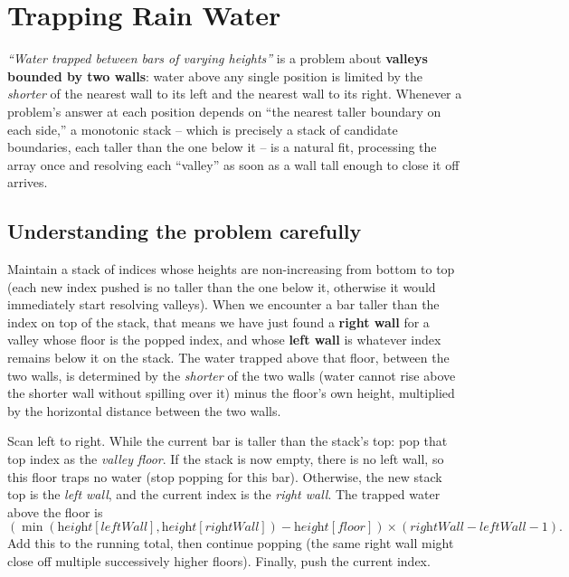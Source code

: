 \section{Trapping Rain Water}
\label{sec:sq-trapping-rain-water}


\begin{patternbox}
\emph{``Water trapped between bars of varying heights''} is a problem
about \textbf{valleys bounded by two walls}: water above any single
position is limited by the \emph{shorter} of the nearest wall to its left
and the nearest wall to its right. Whenever a problem's answer at each
position depends on ``the nearest taller boundary on each side,'' a
monotonic stack -- which is precisely a stack of candidate boundaries,
each taller than the one below it -- is a natural fit, processing the
array once and resolving each ``valley'' as soon as a wall tall enough to
close it off arrives.
\end{patternbox}

\subsection*{Understanding the problem carefully}

Maintain a stack of indices whose heights are non-increasing from bottom
to top (each new index pushed is no taller than the one below it,
otherwise it would immediately start resolving valleys). When we
encounter a bar taller than the index on top of the stack, that means we
have just found a \textbf{right wall} for a valley whose floor is the
popped index, and whose \textbf{left wall} is whatever index remains below
it on the stack. The water trapped above that floor, between the two
walls, is determined by the \emph{shorter} of the two walls (water cannot
rise above the shorter wall without spilling over it) minus the floor's
own height, multiplied by the horizontal distance between the two walls.

\begin{ideabox}
Scan left to right. While the current bar is taller than the stack's top:
pop that top index as the \textit{valley floor}. If the stack is now
empty, there is no left wall, so this floor traps no water (stop popping
for this bar). Otherwise, the new stack top is the \textit{left wall}, and
the current index is the \textit{right wall}. The trapped water above the
floor is
\[
  (\min(\textit{height}[\textit{leftWall}],
  \textit{height}[\textit{rightWall}]) - \textit{height}[\textit{floor}])
  \times (\textit{rightWall} - \textit{leftWall} - 1).
\]
Add this to the running total, then continue popping (the same right wall
might close off multiple successively higher floors). Finally, push the
current index.
\end{ideabox}

